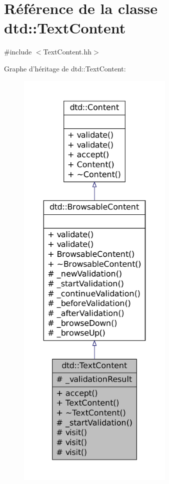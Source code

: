 \hypertarget{classdtd_1_1_text_content}{
\section{Référence de la classe dtd::TextContent}
\label{classdtd_1_1_text_content}
}


{\ttfamily \#include $<$TextContent.hh$>$}



Graphe d'héritage de dtd::TextContent:\nopagebreak
\begin{figure}[H]
\begin{center}
\leavevmode
\includegraphics[height=600pt]{classdtd_1_1_text_content__inherit__graph}
\end{center}
\end{figure}



